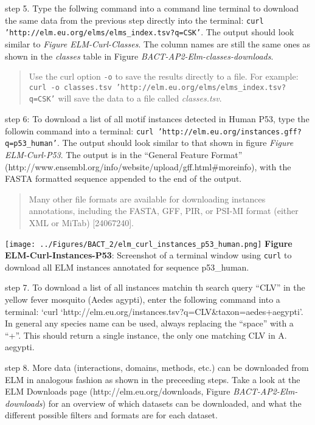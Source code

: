 step 5. Type the follwing command into a command line terminal to
download the same data from the previous step directly into the
terminal: \texttt{curl 'http://elm.eu.org/elms/elms\_index.tsv?q=CSK'}.
The output should look similar to \emph{Figure ELM-Curl-Classes}. The
column names are still the same ones as shown in the \emph{classes}
table in Figure \emph{BACT-AP2-Elm-classes-downloads}.

\begin{quote}
Use the curl option \texttt{-o} to save the results directly to a file.
For example:
\texttt{curl -o classes.tsv 'http://elm.eu.org/elms/elms\_index.tsv?q=CSK'}
will save the data to a file called \emph{classes.tsv}.
\end{quote}

step 6: To download a list of all motif instances detected in Human P53,
type the followin command into a terminal:
\texttt{curl 'http://elm.eu.org/instances.gff?q=p53\_human'}. The output
should look similar to that shown in figure \emph{Figure ELM-Curl-P53}.
The output is in the ``General Feature Format''
(http://www.ensembl.org/info/website/upload/gff.html\#moreinfo), with
the FASTA formatted sequence appended to the end of the output.

\begin{quote}
Many other file formats are available for downloading instances
annotations, including the FASTA, GFF, PIR, or PSI-MI format (either XML
or MiTab) {[}24067240{]}.
\end{quote}

\texttt{[image: ../Figures/BACT\_2/elm\_curl\_instances\_p53\_human.png]}
\textbf{Figure ELM-Curl-Instances-P53}: Screenshot of a terminal window
using \texttt{curl} to download all ELM instances annotated for sequence
p53\_human.

step 7. To download a list of all instances matchin th search query
``CLV'' in the yellow fever mosquito (Aedes agypti), enter the following
command into a terminal: `curl
`http://elm.eu.org/instances.tsv?q=CLV\&taxon=aedes+aegypti'. In general
any species name can be used, always replacing the ``space'' with a
``+''. This should return a single instance, the only one matching CLV
in A. aegypti.

step 8. More data (interactions, domains, methods, etc.) can be
downloaded from ELM in analogous fashion as shown in the preceeding
steps. Take a look at the ELM Downloads page
(http://elm.eu.org/downloads, Figure \emph{BACT-AP2-Elm-downloads}) for
an overview of which datasets can be downloaded, and what the different
possible filters and formats are for each dataset.

